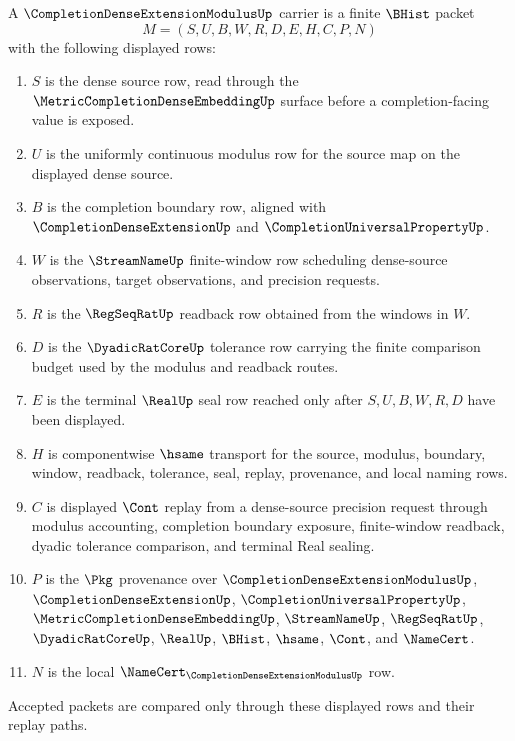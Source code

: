 \begin{definition}
\label{def:completion-dense-extension-modulus-carrier}
A $\CompletionDenseExtensionModulusUp$ carrier is a finite $\BHist$ packet
$$
M=(S,U,B,W,R,D,E,H,C,P,N)
$$
with the following displayed rows:
\begin{enumerate}
\item $S$ is the dense source row, read through the $\MetricCompletionDenseEmbeddingUp$ surface before a completion-facing value is exposed.
\item $U$ is the uniformly continuous modulus row for the source map on the displayed dense source.
\item $B$ is the completion boundary row, aligned with $\CompletionDenseExtensionUp$ and $\CompletionUniversalPropertyUp$.
\item $W$ is the $\StreamNameUp$ finite-window row scheduling dense-source observations, target observations, and precision requests.
\item $R$ is the $\RegSeqRatUp$ readback row obtained from the windows in $W$.
\item $D$ is the $\DyadicRatCoreUp$ tolerance row carrying the finite comparison budget used by the modulus and readback routes.
\item $E$ is the terminal $\RealUp$ seal row reached only after $S,U,B,W,R,D$ have been displayed.
\item $H$ is componentwise $\hsame$ transport for the source, modulus, boundary, window, readback, tolerance, seal, replay, provenance, and local naming rows.
\item $C$ is displayed $\Cont$ replay from a dense-source precision request through modulus accounting, completion boundary exposure, finite-window readback, dyadic tolerance comparison, and terminal Real sealing.
\item $P$ is the $\Pkg$ provenance over $\CompletionDenseExtensionModulusUp$, $\CompletionDenseExtensionUp$, $\CompletionUniversalPropertyUp$, $\MetricCompletionDenseEmbeddingUp$, $\StreamNameUp$, $\RegSeqRatUp$, $\DyadicRatCoreUp$, $\RealUp$, $\BHist$, $\hsame$, $\Cont$, and $\NameCert$.
\item $N$ is the local $\NameCert_{\CompletionDenseExtensionModulusUp}$ row.
\end{enumerate}
Accepted packets are compared only through these displayed rows and their replay paths.
\end{definition}

